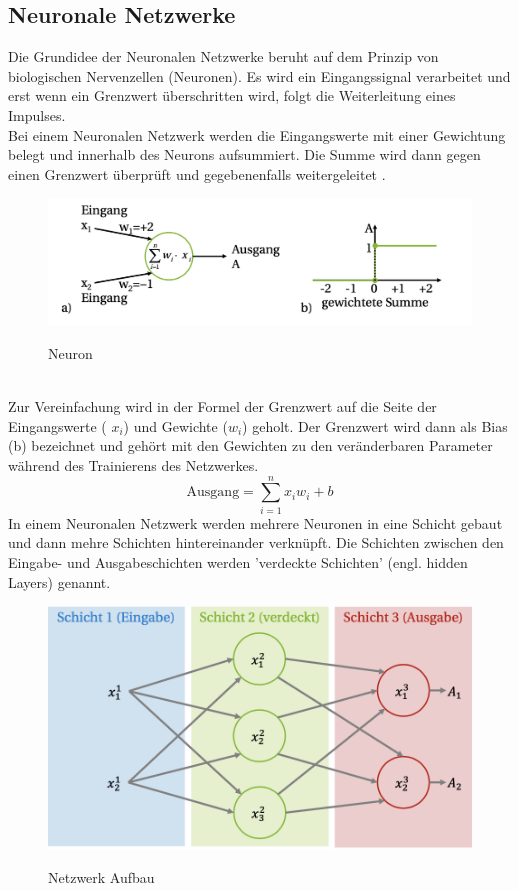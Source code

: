 \subsection{Neuronale Netzwerke}
Die Grundidee der Neuronalen Netzwerke beruht auf dem Prinzip von biologischen Nervenzellen (Neuronen).  Es wird ein Eingangssignal verarbeitet und erst wenn ein Grenzwert überschritten wird,  folgt die Weiterleitung eines Impulses.\\
Bei einem Neuronalen Netzwerk werden die Eingangswerte mit einer Gewichtung belegt und innerhalb des Neurons aufsummiert.  Die Summe wird dann gegen einen Grenzwert überprüft und gegebenenfalls weitergeleitet \cite{Matzka_2021}.
\begin{figure}[h]
\centering
\includegraphics[scale=0.5]{pic/Neuron}
\caption[Neuron]{Neuron}\cite{Matzka_2021}
\end{figure}\\
Zur Vereinfachung wird in der Formel der Grenzwert auf die Seite der Eingangswerte ( $x_{i}$)  und Gewichte ($w_{i}$) geholt.  Der Grenzwert wird dann als Bias (b) bezeichnet und gehört mit den Gewichten zu den veränderbaren Parameter während des Trainierens des Netzwerkes. \cite{url:neuralnetworksanddeeplearning.com-2021}\\
\begin{equation} \label{linFunc}
\text{Ausgang} = \sum_{i=1}^{n} x_{i}w_{i} + b
\end{equation}
In einem Neuronalen Netzwerk werden mehrere Neuronen in eine Schicht gebaut und dann mehre Schichten hintereinander verknüpft.  Die Schichten zwischen den Eingabe- und Ausgabeschichten werden 'verdeckte Schichten' (engl. hidden Layers) genannt. \\
\begin{figure}[h]
\centering
\includegraphics[scale=0.6]{pic/Netzwerk}
\caption{Netzwerk Aufbau}\cite{Matzka_2021}
\end{figure}\\
